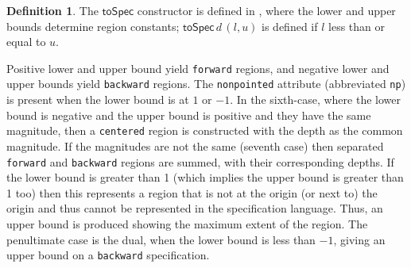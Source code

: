 \documentclass[10pt,preprint,numbers]{sigplanconf}
\newcounter{block}
\theoremstyle{definition}
\newtheorem{definition}[block]{Definition}
\newcommand{\term}[1]{\texttt{#1}}
\begin{document}
\begin{definition} The $\mathsf{toSpec}$ constructor is defined
in , where the lower and upper bounds
determine region constants; $\mathsf{toSpec} \, d \, (l, u)$ is defined
 if $l$ less than or equal to $u$.

Positive lower and upper bound yield \term{forward} regions, and
negative lower and upper bounds yield \term{backward} regions.
The \texttt{nonpointed} attribute (abbreviated \term{np})
is present when the lower bound is at $1$ or $-1$. 
In the sixth-case, where the lower bound
is negative and the upper bound is positive and they have the same
magnitude, then a \texttt{centered} region is constructed with
the depth as the common magnitude. If the magnitudes are not the same
(seventh case) then separated \texttt{forward} and \texttt{backward}
regions are summed, with their corresponding depths.
If the lower bound is greater than 1
(which implies the upper bound is greater than 1 too) then
this represents a region that is not at the origin (or next to) the
origin and thus cannot be represented in the specification language.
Thus, an upper bound is produced showing the maximum extent
of the region. The penultimate case is the dual, when the lower bound is less
than $-1$, giving an upper bound on a \texttt{backward} specification.
\end{definition}
\end{document}
